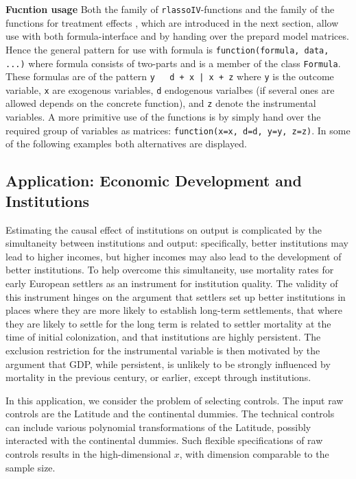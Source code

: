 \documentclass{amsart}\usepackage[]{graphicx}\usepackage[]{color}
\newcommand{\code}[1]{\texttt{#1}}
\begin{document}
\textbf{Fucntion usage} Both the family of \code{rlassoIV}-functions and the family of the functions for treatment effects , which are introduced in the next section, allow use with both formula-interface and by handing over the prepard model matrices. Hence the general pattern  for use with formula is \code{function(formula, data, ...)} where formula consists of two-parts and is a member of the class \code{Formula}. These formulas are of the pattern \code{y ~ d + x | x + z} where \code{y} is the outcome variable, \code{x} are exogenous variables, \code{d} endogenous varialbes (if several ones are allowed depends on the concrete function), and \code{z} denote the instrumental variables. A more primitive use of the functions is by simply hand over the required group of variables as matrices: \code{function(x=x, d=d, y=y, z=z)}. In some of the following examples both alternatives are displayed.   

\subsection{Application: Economic Development and Institutions}
Estimating the causal effect of institutions on output is complicated by the simultaneity between institutions and output: specifically, better institutions may
lead to higher incomes, but higher incomes may also lead to the development of
better institutions. To help overcome this simultaneity, \citet{acemoglu:colonial} use mortality rates for early European settlers as an instrument
for institution quality. The validity of this instrument hinges on the argument that
settlers set up better institutions in places where they are more likely to establish
long-term settlements, that where they are likely to settle for the long term is related
to settler mortality at the time of initial colonization, and that institutions are highly
persistent. The exclusion restriction for the instrumental variable is then motivated
by the argument that GDP, while persistent, is unlikely to be strongly influenced by
mortality in the previous century, or earlier, except through institutions.


In this application, we consider the problem of selecting
controls. The input raw controls are the Latitude and the continental dummies. The technical controls can include various polynomial transformations of the Latitude, possibly interacted with the continental dummies. Such flexible specifications of raw controls results in the high-dimensional $x$, with dimension comparable to the sample size.
\end{document}
